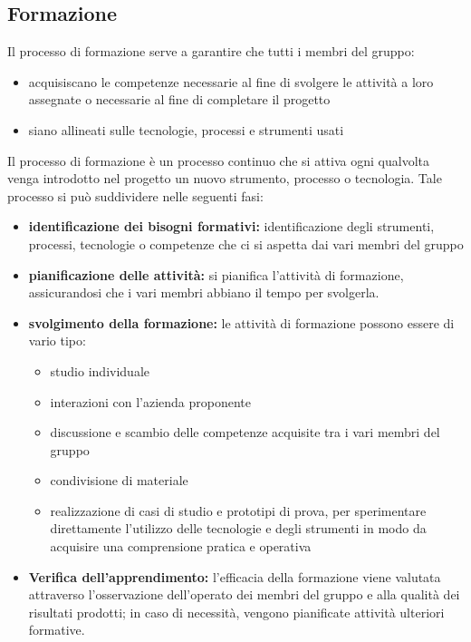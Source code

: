 \documentclass[a4paper, 11pt]{article}
\begin{document}
\subsection{Formazione}
Il processo di formazione serve a garantire che tutti i membri del gruppo:
\begin{itemize}
    \item acquisiscano le competenze necessarie al fine di svolgere le attività a loro assegnate o necessarie al fine di completare il progetto
    \item siano allineati sulle tecnologie, processi e strumenti usati
\end{itemize}
Il processo di formazione è un processo continuo che si attiva ogni qualvolta venga introdotto nel progetto un nuovo strumento, processo o tecnologia. Tale processo si può suddividere nelle seguenti fasi:
\begin{itemize}
    \item \textbf{identificazione dei bisogni formativi:} identificazione degli strumenti, processi, tecnologie o competenze che ci si aspetta dai vari membri del gruppo
    \item \textbf{pianificazione delle attività:} si pianifica l'attività di formazione, assicurandosi che i vari membri abbiano il tempo per svolgerla.\\ 
    \item \textbf{svolgimento della formazione:} le attività di formazione possono essere di vario tipo: 
    \begin{itemize}
        \item studio individuale
        \item interazioni con l'azienda proponente
        \item discussione e scambio delle competenze acquisite tra i vari membri del gruppo
        \item condivisione di materiale
        \item realizzazione di casi di studio e prototipi di prova, per sperimentare direttamente l'utilizzo delle tecnologie e degli strumenti
         in modo da acquisire una comprensione pratica e operativa
    \end{itemize}
    \item \textbf{Verifica dell'apprendimento:} l'efficacia della formazione viene valutata attraverso l'osservazione dell'operato dei membri del gruppo e alla qualità dei risultati prodotti; in caso di necessità, vengono pianificate attività ulteriori formative.
\end{itemize}
\end{document}
